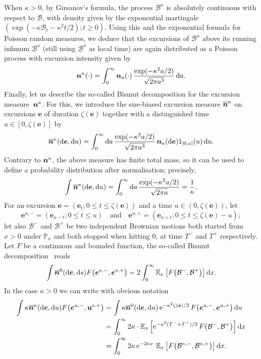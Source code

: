 \documentclass[JEP,XML,SOM,Unicode,NoFloatCountersInSection,NoEqCountersInSection]{cedram}
\newcommand{\bme}{\boldsymbol{e}}
\newcommand{\bmn}{\protect\boldsymbol{n}}
\theoremstyle{plain}
\theoremstyle{definition}
\theoremstyle{remark}
\renewcommand{\P}{\mathbb{P}}
\newcommand{\E}{\mathbb{E}}
\newcommand{\e}{\operatorname{e}}
\renewcommand{\d}{\mathop{}\!\mathrm{d}}
\begin{document}
When $\kappa\!>\!0$, by Girsanov's formula, the process $\mathcal{B}^\kappa$ is absolutely continuous with respect to $\mathcal{B}$, with density given by the exponential martingale \hbox{$(\exp(-\kappa \mathcal{B}_t \!-\! \kappa^2t/2) ; t \!\!\ge\! 0)$}. Using this and the exponential formula for Poisson random measures, we deduce that the excursions of $\mathcal{B}^{\kappa}$ above its running infimum $\underline{\mathcal{B}}^{\kappa}$ (still using $\underline{\mathcal{B}}^{\kappa}$ as local time) are again distributed as a Poisson process with excursion intensity given by
\[
\bmn^{\kappa}(\cdot) = \int_0^\infty \bmn_a(\cdot)\, \frac{\exp(-\kappa^2 a/2)}{\sqrt{2\pi a^3}} \d a.
\]
Finally, let us describe the so-called Bismut decomposition for the excursion measure~$\bmn^{\kappa}$. For this, we introduce the size-biased excursion measure $\overline{\bmn}^{\kappa}$ on excursions $\bme$ of duration $\zeta(\bme)$ together with a distinguished time $u \in [0, \zeta(\bme)]$ by
\begin{equation}\label{eq:excursion_biaisee}
\overline{\bmn}^{\kappa}(\d \bme, \d u) = \int_0^\infty \d a\, \frac{\exp(-\kappa^2 a/2)}{\sqrt{2\pi a^3}}\, \bmn_a(\d \bme) 1_{[0,a]}(u) \d u.
\end{equation}
Contrary to $\bmn^{\kappa}$, the above measure has finite total mass, so it can be used to define a probability distribution after normalisation; precisely,
\[
\int \overline{\bmn}^{\kappa}(\d \bme, \d u) = \int_0^\infty \d a\, \frac{\exp(-\kappa^2 a/2)}{\sqrt{2\pi a}} = \frac{1}{\kappa}.
\]
For an excursion $\bme=(\bme_t ; 0 \le t \le \zeta(\bme))$ and a time $u \in (0, \zeta(\bme))$, let
\[
\bme^{u,-} = (\bme_{u-t} ; 0\le t \le u)\quad\text{and}\quad \bme^{u,+} = (\bme_{u+t} ; 0\le t \le \zeta(\bme)-u);
\]
let also $\mathcal{B}^-$ and $\mathcal{B}^+$ be two independent Brownian motions both started from $x>0$ under $\P_x$ and both stopped when hitting $0$, at time $T^-$ and $T^+$ respectively. Let $F$ be a continuous and bounded function, the so-called Bismut decomposition~\cite[Th.\,4.7, Chap.\,XII, p.\,502]{RY99} reads
\[
\int \overline{\bmn}^{0}(\d \bme, \d s) F\big(\bme^{s,-}, \bme^{s,+}\big)
= 2 \int_0^\infty \E_x\left[F\big(\mathcal{B}^-, \mathcal{B}^+\big)\right] \d x.
\]
In the case $\kappa >0$ we can write with obvious notation
\begin{align*}
\int \kappa \overline{\bmn}^{\kappa}(\d \bme, \d u) F\big(\bme^{u,-}, \mathbf{u}^{s,+}\big)
&= \int \kappa \overline{\bmn}^{0} (\d \bme, \d u) \e^{-\kappa^2\zeta(\bme)/2} F \big(\bme^{u,-}, \bme^{u,+}\big) \d u
\\
&= \int_0^\infty 2\kappa \cdot \E_x\left[\e^{-\kappa^2 (T^-+T^+)/2} F\big(\mathcal{B}^-, \mathcal{B}^+\big)\right] \d x
\\
&= \int_0^\infty 2\kappa \e^{-2 \kappa x} \, \E_x\left[F\big(\mathcal{B}^{\kappa,-}, \mathcal{B}^{\kappa,+}\big)\right] \d x.
\end{align*}
\end{document}

